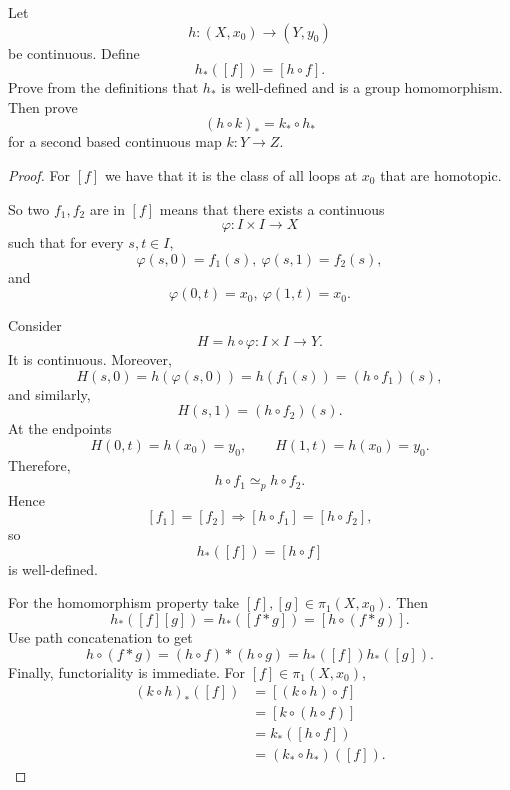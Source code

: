 \documentclass[11pt]{article}
\begin{document}
\begin{prob}
    Let 
    \[
        h : (X, x_0) \to (Y, y_0)
    \]
    be continuous. Define 
    \[
        h_*([f]) = [h \circ f]. 
    \]
    Prove from the definitions that $h_*$ is 
    well-defined and is a group homomorphism.
    Then prove 
    \[
        (h \circ k)_* = k_* \circ h_*
    \]
    for a second based continuous map $k : Y \to Z$.
\end{prob}
\begin{proof}
    For $[f]$ we have that 
    it is the class of all loops at $x_0$ that are homotopic.

    So two $f_1,f_2$ are in $[f]$ means that 
    there exists a continuous 
    \[
        \varphi : I \times I \to X 
    \]
    such that for every $s,t\in I$, 
    \[
        \varphi(s,0) = f_1(s), \ 
        \varphi(s,1) = f_2(s),
    \]
    and 
    \[
        \varphi(0,t) = x_0, \ \varphi(1,t) = x_0.
    \]

    Consider 
    \[
        H = h \circ \varphi : I \times I \to Y.  
    \]
    It is continuous. Moreover, 
    \[
        H(s,0)
        =
        h(\varphi(s,0))
        =
        h(f_1(s))
        =
        (h\circ f_1)(s),
    \]
    and similarly, 
    \[
        H(s,1)=(h\circ f_2)(s).
    \]
    At the endpoints 
    \[
        H(0,t)=h(x_0)=y_0,
        \qquad
        H(1,t)=h(x_0)=y_0.
    \]
    Therefore, 
    \[
        h\circ f_1\simeq_p h\circ f_2.
    \]
    Hence 
    \[
        [f_1]=[f_2]
        \Longrightarrow
        [h\circ f_1]=[h\circ f_2],
    \]
    so 
    \[
        h_*([f]) = [h \circ f]
    \]
    is well-defined.

    For the homomorphism property take 
    $[f],[g] \in \pi_1(X,x_0)$.
    Then 
    \[
        h_*([f][g]) 
        = h_*([f * g]) 
        = [h \circ (f*g)]. 
    \]
    Use path concatenation to get 
    \[
        h \circ (f * g) = (h\circ f) * (h \circ g) 
        = h_*([f])h_*([g]).
    \]
    Finally, functoriality is immediate. 
    For $[f] \in \pi_1(X,x_0)$, 
    \begin{align*}
        (k\circ h)_*([f])
        &=[(k\circ h)\circ f]\\
        &=[k\circ(h\circ f)]\\
        &=k_*([h\circ f])\\
        &=(k_*\circ h_*)([f]).
    \end{align*}
\end{proof}
\end{document}
